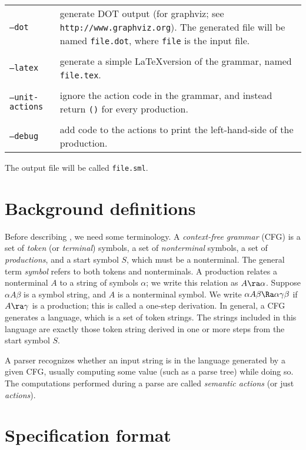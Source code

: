 \vskip 12pt
\begin{tabular}{lp{}}
  \texttt{--dot} & generate DOT output (for graphviz; see \texttt{http://www.graphviz.org}).
    The generated file will be named \texttt{file.dot}, where \texttt{file} is the input file. \\
  \\
  \texttt{--latex} & generate a simple \LaTeX version of the grammar, named \texttt{file.tex}. \\
  \\
  \texttt{--unit-actions} & ignore the action code in the grammar, and instead return \texttt{()}
    for every production. \\
  \\
  \texttt{--debug} & add code to the actions to print the left-hand-side of the production.
\end{tabular}%

\vskip 10pt \noindent
The output file will be called \texttt{file.sml}.

\section{Background definitions}

Before describing \antlr{}, we need some terminology.  A \emph{context-free grammar} (CFG) is a set of \emph{token} (or \emph{terminal}) symbols, a set of \emph{nonterminal} symbols, a set of \emph{productions}, and a start symbol $S$, which must be a nonterminal.  
The general term \emph{symbol} refers to both tokens and nonterminals.  A production relates a nonterminal $A$ to a string of symbols $\alpha$; we write this relation as $A \ra \alpha$.  Suppose $\alpha A \beta$ is a symbol string, and $A$ is a nonterminal symbol.  We write $\alpha A \beta \Ra \alpha \gamma \beta$ if $A \ra \gamma$ is a production; this is called a one-step derivation.  In general, a CFG generates a language, which is a set of token strings.  The strings included in this language are exactly those token string derived in one or more steps from the start symbol $S$.

A parser recognizes whether an input string is in the language generated by a given CFG, usually computing some value (such as a parse tree) while doing so.  The computations performed during a parse are called \emph{semantic actions} (or just \emph{actions}).

\section{Specification format}\label{sec:antlr-spec}

